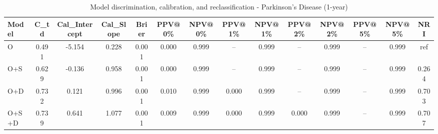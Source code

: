 \begin{table}[htbp]
\centering
\small
\caption{Model discrimination, calibration, and reclassification - Parkinson's Disease (1-year)}
\label{tab:perf_pd_1y}
\begin{tabular}{lccccccccccccc}
\toprule
Model & C\_td & Cal\_Intercept & Cal\_Slope & Brier & PPV@0\% & NPV@0\% & PPV@1\% & NPV@1\% & PPV@2\% & NPV@2\% & PPV@5\% & NPV@5\% & NRI \\
\midrule
O & 0.491 & -5.154 & 0.228 & 0.001 & 0.000 & 0.999 & -- & 0.999 & -- & 0.999 & -- & 0.999 & ref \\
O+S & 0.629 & -0.136 & 0.958 & 0.001 & 0.000 & 0.999 & -- & 0.999 & -- & 0.999 & -- & 0.999 & 0.264 \\
O+D & 0.732 & 0.121 & 0.996 & 0.001 & 0.010 & 0.999 & 0.000 & 0.999 & -- & 0.999 & -- & 0.999 & 0.703 \\
O+S+D & 0.739 & 0.641 & 1.077 & 0.001 & 0.009 & 0.999 & 0.000 & 0.999 & 0.000 & 0.999 & -- & 0.999 & 0.707 \\
\bottomrule
\end{tabular}
\end{table}